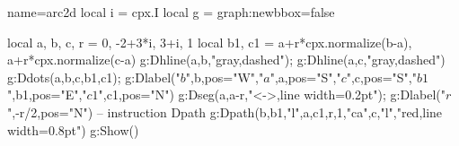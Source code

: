\documentclass[border=5pt]{standalone}
\begin{document}
\begin{luadraw}{name=arc2d}
local i = cpx.I
local g = graph:new{bbox=false}

local a, b, c, r = 0, -2+3*i, 3+i, 1
local b1, c1 = a+r*cpx.normalize(b-a), a+r*cpx.normalize(c-a)
g:Dhline({a,b},"gray,dashed"); g:Dhline({a,c},"gray,dashed")
g:Ddots({a,b,c,b1,c1}); g:Dlabel("$b$",b,{pos="W"},"$a$",a,{pos="S"},"$c$",c,{pos="S"},"$b1$",b1,{pos="E"},"$c1$",c1,{pos="N"})
g:Dseg({a,a-r},"<->,line width=0.2pt"); g:Dlabel("$r$",-r/2,{pos="N"})
-- instruction Dpath
g:Dpath({b,b1,"l",a,c1,r,1,"ca",c,"l"},"red,line width=0.8pt")
g:Show()
\end{luadraw}
\end{document}
